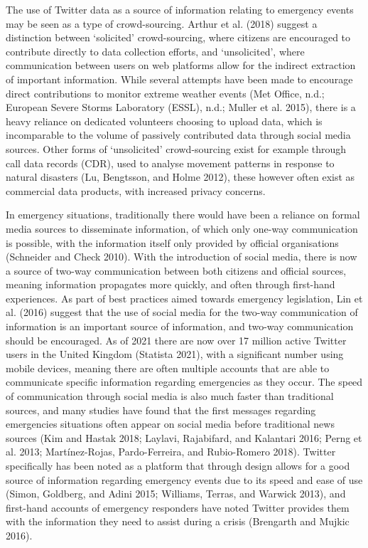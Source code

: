 \documentclass[a4paper, notitlepage]{extreport}
\begin{document}
The use of Twitter data as a source of information relating to emergency
events may be seen as a type of crowd-sourcing. Arthur et al. (2018)
suggest a distinction between `solicited' crowd-sourcing, where citizens
are encouraged to contribute directly to data collection efforts, and
`unsolicited', where communication between users on web platforms allow
for the indirect extraction of important information. While several
attempts have been made to encourage direct contributions to monitor
extreme weather events (Met Office, n.d.; European Severe Storms
Laboratory (ESSL), n.d.; Muller et al. 2015), there is a heavy reliance
on dedicated volunteers choosing to upload data, which is incomparable
to the volume of passively contributed data through social media
sources. Other forms of `unsolicited' crowd-sourcing exist for example
through call data records (CDR), used to analyse movement patterns in
response to natural disasters (Lu, Bengtsson, and Holme 2012), these
however often exist as commercial data products, with increased privacy
concerns.

In emergency situations, traditionally there would have been a reliance
on formal media sources to disseminate information, of which only
one-way communication is possible, with the information itself only
provided by official organisations (Schneider and Check 2010). With the
introduction of social media, there is now a source of two-way
communication between both citizens and official sources, meaning
information propagates more quickly, and often through first-hand
experiences. As part of best practices aimed towards emergency
legislation, Lin et al. (2016) suggest that the use of social media for
the two-way communication of information is an important source of
information, and two-way communication should be encouraged. As of 2021
there are now over 17 million active Twitter users in the United Kingdom
(Statista 2021), with a significant number using mobile devices, meaning
there are often multiple accounts that are able to communicate specific
information regarding emergencies as they occur. The speed of
communication through social media is also much faster than traditional
sources, and many studies have found that the first messages regarding
emergencies situations often appear on social media before traditional
news sources (Kim and Hastak 2018; Laylavi, Rajabifard, and Kalantari
2016; Perng et al. 2013; Martínez-Rojas, Pardo-Ferreira, and
Rubio-Romero 2018). Twitter specifically has been noted as a platform
that through design allows for a good source of information regarding
emergency events due to its speed and ease of use (Simon, Goldberg, and
Adini 2015; Williams, Terras, and Warwick 2013), and first-hand accounts
of emergency responders have noted Twitter provides them with the
information they need to assist during a crisis (Brengarth and Mujkic
2016).
\end{document}
